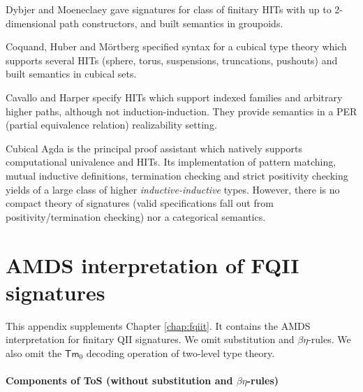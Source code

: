 \documentclass[12pt,a4paper,twoside,openany]{book}
\theoremstyle{remark}
\theoremstyle{definition}
\theoremstyle{theorem}
\newcommand{\Tm}{\mathsf{Tm}}
\begin{document}
Dybjer and Moeneclaey \cite{moeneclaey} gave signatures for class of finitary
HITs with up to 2-dimensional path constructors, and built semantics in
groupoids.

Coquand, Huber and Mörtberg \cite{cubicalhits} specified syntax for a cubical
type theory which supports several HITs (sphere, torus, suspensions,
truncations, pushouts) and built semantics in cubical sets.

Cavallo and Harper \cite{cubicalcomptt} specify HITs which support indexed
families and arbitrary higher paths, although not induction-induction. They
provide semantics in a PER (partial equivalence relation) realizability setting.

Cubical Agda \cite{cubicalagda} is the principal proof assistant which natively
supports computational univalence and HITs. Its implementation of pattern
matching, mutual inductive definitions, termination checking and strict
positivity checking yields of a large class of higher \emph{inductive-inductive}
types. However, there is no compact theory of signatures (valid specifications
fall out from positivity/termination checking) nor a categorical semantics.


\appendix

\chapter{AMDS interpretation of FQII signatures}
\label{app:fqii-amds}

This appendix supplements Chapter \ref{chap:fqiit}. It contains the AMDS
interpretation for finitary QII signatures. We omit substitution and
$\beta\eta$-rules. We also omit the $\Tm_0$ decoding operation of two-level type
theory.

\pagebreak

\subsubsection{Components of ToS (without substitution and $\beta\eta$-rules)}
\end{document}
